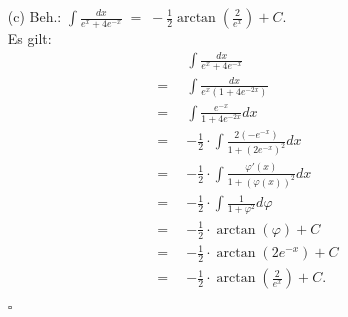 \documentclass[12pt]{article}
\newcommand{\QED}{\begin{flushright} $\square$ \end{flushright}}
\begin{document}
\begin{enumerate}
	\item[(c)] Beh.: ${\displaystyle \int \frac{dx}{e^x + 4e^{-x}} \; = \; -\frac{1}{2} \arctan(\frac{2}{e^x}) + C }$. \\
	Es gilt:
	\begin{align*}
		&\int \frac{dx}{e^x + 4e^{-x}} \\
		= \enspace &\int \frac{dx}{e^x(1+4e^{-2x})} \\
		= \enspace &\int \frac{e^{-x}}{1 + 4e^{-2x}} dx \\
		= \enspace &-\frac{1}{2} \cdot \int \frac{2(-e^{-x})}{1+(2e^{-x})^2} dx \\
		= \enspace &-\frac{1}{2} \cdot \int \frac{\varphi'(x)}{1+(\varphi(x))^2} dx \\
		= \enspace &-\frac{1}{2} \cdot \int \frac{1}{1+\varphi^2} d\varphi \\
		= \enspace &-\frac{1}{2} \cdot \arctan(\varphi) + C \\
		= \enspace &-\frac{1}{2} \cdot \arctan(2e^{-x}) + C \\
		= \enspace &-\frac{1}{2} \cdot \arctan\left(\frac{2}{e^x}\right) + C.
	\end{align*}
	\QED
\end{enumerate}
\end{document}
